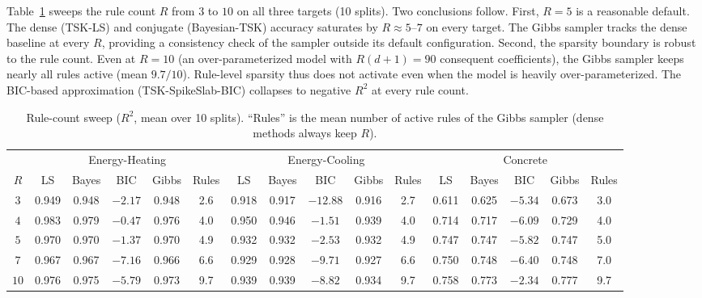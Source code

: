 \documentclass[review,1p,times]{elsarticle}
\begin{document}
Table~\ref{tab:rsweep} sweeps the rule count $R$ from $3$ to $10$ on all three targets (10 splits). Two conclusions follow.
First, $R=5$ is a reasonable default.
The dense (TSK-LS) and conjugate (Bayesian-TSK) accuracy saturates by $R\approx5$--$7$ on every target.
The Gibbs sampler tracks the dense baseline at every $R$, providing a consistency check of the sampler outside its default configuration.
Second, the sparsity boundary is robust to the rule count.
Even at $R=10$ (an over-parameterized model with $R(d{+}1)=90$ consequent coefficients), the Gibbs sampler keeps nearly all rules active (mean $9.7/10$).
Rule-level sparsity thus does not activate even when the model is heavily over-parameterized. The BIC-based approximation (TSK-SpikeSlab-BIC) collapses to negative $R^2$ at every rule count.

\begin{table}[htbp]
\centering
\caption{Rule-count sweep ($R^2$, mean over 10 splits). ``Rules'' is the mean number of active rules of the Gibbs sampler (dense methods always keep $R$).}
\label{tab:rsweep}
\footnotesize
\setlength{\tabcolsep}{3pt}
\begin{tabular}{c|ccccc|ccccc|ccccc}
\toprule
& \multicolumn{5}{c|}{Energy-Heating} & \multicolumn{5}{c|}{Energy-Cooling} & \multicolumn{5}{c}{Concrete} \\
$R$ & LS & Bayes & BIC & Gibbs & Rules & LS & Bayes & BIC & Gibbs & Rules & LS & Bayes & BIC & Gibbs & Rules \\
\midrule
$3$  & 0.949 & 0.948 & $-2.17$ & 0.948 & 2.6 & 0.918 & 0.917 & $-12.88$ & 0.916 & 2.7 & 0.611 & 0.625 & $-5.34$ & 0.673 & 3.0 \\
$4$  & 0.983 & 0.979 & $-0.47$ & 0.976 & 4.0 & 0.950 & 0.946 & $-1.51$ & 0.939 & 4.0 & 0.714 & 0.717 & $-6.09$ & 0.729 & 4.0 \\
$5$  & 0.970 & 0.970 & $-1.37$ & 0.970 & 4.9 & 0.932 & 0.932 & $-2.53$ & 0.932 & 4.9 & 0.747 & 0.747 & $-5.82$ & 0.747 & 5.0 \\
$7$  & 0.967 & 0.967 & $-7.16$ & 0.966 & 6.6 & 0.929 & 0.928 & $-9.71$ & 0.927 & 6.6 & 0.750 & 0.748 & $-6.40$ & 0.748 & 7.0 \\
$10$ & 0.976 & 0.975 & $-5.79$ & 0.973 & 9.7 & 0.939 & 0.939 & $-8.82$ & 0.934 & 9.7 & 0.758 & 0.773 & $-2.34$ & 0.777 & 9.7 \\
\bottomrule
\end{tabular}
\end{table}
\end{document}
